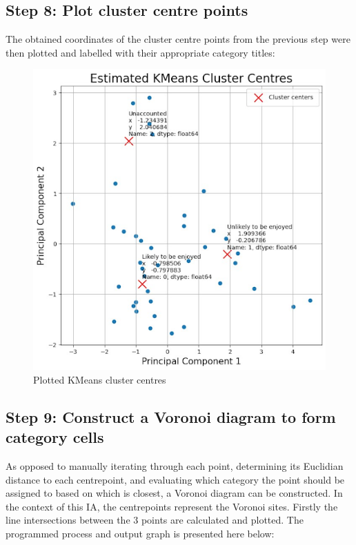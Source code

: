 \documentclass[12pt]{article}
\begin{document}
\subsection{Step 8: Plot cluster centre points}
The obtained coordinates of the cluster centre points from the previous step were then plotted and labelled with their appropriate category titles:

\begin{figure}[H]
	\includegraphics[scale=0.4]{9}
	\centering
	\caption{Plotted KMeans cluster centres}
\end{figure}

\subsection{Step 9: Construct a Voronoi diagram to form category cells}
As opposed to manually iterating through each point, determining its Euclidian distance to each centrepoint, and evaluating which category the point should be assigned to based on which is closest, a Voronoi diagram can be constructed. In the context of this IA, the centrepoints represent the Voronoi sites. Firstly the line intersections between the $3$ points are calculated and plotted. The programmed process and output graph is presented here below:
\end{document}
